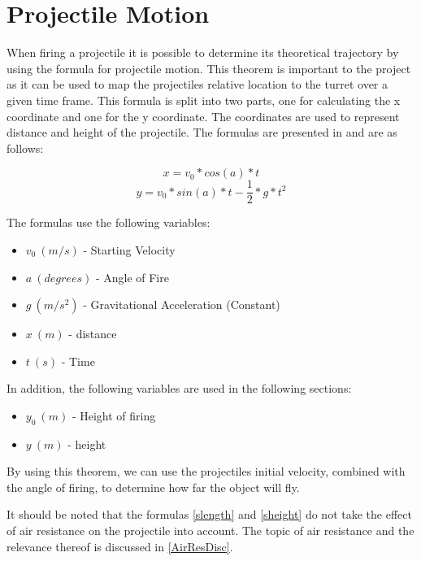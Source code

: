 \section{Projectile Motion}\label{ProjMotion}
When firing a projectile it is possible to determine its theoretical trajectory
by using the formula for projectile motion. This theorem is important to the
project as it can be used to map the projectiles relative location to the turret
over a given time frame. This formula is split into two parts, one for
calculating the x coordinate and one for the y coordinate. The coordinates are
used to represent distance and height of the projectile. The formulas are
presented in \citep[Ch. 6.2]{OrbitBA} and are as follows:

\begin{equation}\label{slength}
x=v_0*cos(a)*t
\end{equation}
\begin{equation}\label{sheight}
y=v_0*sin(a)*t-\frac{1}{2}*g*t^2
\end{equation}

The formulas use the following variables:
\begin{itemize}
  \item $v_0\ (m/s)$ - Starting Velocity
  \item $a\ (degrees)$ - Angle of Fire
  \item $g\ (m/s^2)$ - Gravitational Acceleration (Constant)
  \item $x\ (m)$ - distance
  \item $t\ (s)$ - Time
\end{itemize}
In addition, the following variables are used in the following sections:
\begin{itemize}
  \item $y_0\ (m)$ - Height of firing
  \item $y\ (m)$ - height
\end{itemize}

By using this theorem, we can use the projectiles initial velocity, combined
with the angle of firing, to determine how far the object will fly.\nl

It should be noted that the formulas \autoref{slength} and \autoref{sheight} do
not take the effect of air resistance on the projectile into account. The topic
of air resistance and the relevance thereof is discussed in \autoref{AirResDisc}.

